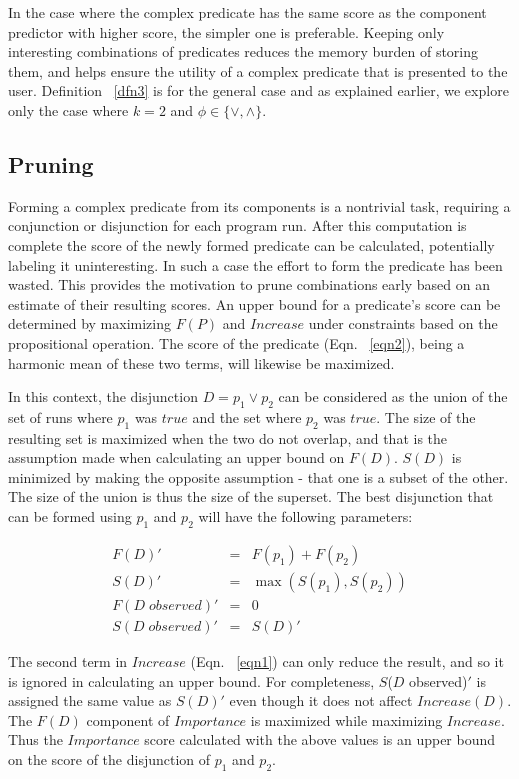 In the case where the complex predicate has the same score as the component predictor with higher score, the simpler one is preferable.  Keeping only interesting combinations of predicates reduces the memory burden of storing them, and helps ensure the utility of a complex predicate that is presented to the user.  Definition ~\ref{dfn3} is for the general case and as explained earlier, we explore only the case where $k = 2$ and $\phi \in \{\vee, \wedge\}$.

\subsection{Pruning}
\label{sec-pruning}
Forming a complex predicate from its components is a nontrivial task, requiring a conjunction or disjunction for each program run.  After this computation is complete the score of the newly formed predicate can be calculated, potentially labeling it uninteresting.  In such a case the effort to form the predicate has been wasted.  This provides the motivation to prune combinations early based on an estimate of their resulting scores.  An upper bound for a predicate's score can be determined by maximizing $F(P)$ and $Increase$ under constraints based on the propositional operation.  The score of the predicate (Eqn. ~\ref{eqn2}), being a harmonic mean of these two terms, will likewise be maximized.

In this context, the disjunction $D = p_1 \vee p_2$ can be considered as the union of the set of runs where $p_1$ was $true$ and the set where $p_2$ was $true$.  The size of the resulting set is maximized when the two do not overlap, and that is the assumption made when calculating an upper bound on $F(D)$.  $S(D)$ is minimized by making the opposite assumption - that one is a subset of the other.  The size of the union is thus the size of the superset.  The best disjunction that can be formed using $p_1$ and $p_2$ will have the following parameters:

\begin{eqnarray}
 \nonumber %
  F(D)' &=&  F(p_1) + F(p_2) \\
 \nonumber
  S(D)' &=&  \max(S(p_1),S(p_2)) \\
 \nonumber
  F(D\;observed)' &=& 0 \\
 \nonumber
  S(D\;observed)' &=& S(D)'
\end{eqnarray}

The second term in $Increase$ (Eqn. ~\ref{eqn1}) can only reduce the result, and so it is ignored in calculating an upper bound.  For completeness, $S$($D$ observed)$'$ is assigned the same value as $S(D)'$ even though it does not affect $Increase(D)$.  The $F(D)$ component of $Importance$ is maximized while maximizing $Increase$.  Thus the $Importance$ score calculated with the above values is an upper bound on the score of the disjunction of $p_1$ and $p_2$.

